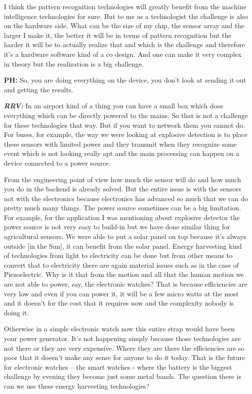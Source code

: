 I think the pattern recognition technologies will greatly benefit from the machine intelligence technologies for sure. But to me as a technologist the challenge is also on the hardware side. What can be the size of my chip, the sensor array and the larger I make it, the better it will be in terms of pattern recognition but the harder it will be to actually realize that and which is the challenge and therefore it’s a hardware software kind of a co design. And one can make it very complex in theory but the realization is a big challenge.

\textbf{PH:} So, you are doing everything on the device, you don’t look at sending it out and getting the results.

\textbf{\textit{RRV:}} In an airport kind of a thing you can have a small box which does everything which can be directly powered to the mains. So that is not a challenge for these technologies that way. But if you want to network them you cannot do. For buses, for example, the way we were looking at explosive detection is to place these sensors with limited power and they transmit when they recognize some event which is not looking really apt and the main processing can happen on a device connected to a power source.

From the engineering point of view how much the sensor will do and how much you do in the backend is already solved. But the entire issue is with the sensors not with the electronics because electronics has advanced so much that we can do pretty much many things. The power source sometimes can be a big limitation. For example, for the application I was mentioning about explosive detector the power source is not very easy to build-in but we have done similar thing for agricultural sensors. We were able to put a solar panel on top because it’s always outside [in the Sun], it can benefit from the solar panel.  Energy harvesting kind of technologies from light to electricity can be done but from other means to convert that to electricity there are again material issues such as in the case of Piezoelectric. Why is it that from the motion and all that the human motion we are not able to power, say, the electronic watches? That is because efficiencies are very low and even if you can power it, it will be a few micro watts at the most and it doesn’t for the cost that it requires now and the complexity nobody is doing it.

Otherwise in a simple electronic watch now this entire strap would have been your power generator. It’s not happening simply because those technologies are not there or they are very expensive. Where they are there the efficiencies are so poor that it doesn’t make any sense for anyone to do it today. That is the future for electronic watches -- the smart watches - where the battery is the biggest challenge by evening they become just some metal bands. The question there is can we use these energy harvesting technologies?

